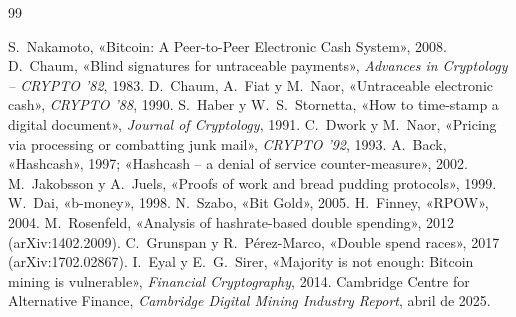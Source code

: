 \documentclass[11pt,a4paper]{article}
\newcommand{\webhint}[1]{}
\begin{document}
\begin{thebibliography}{99}
\webhint{section; id=referencias; slug=referencias; kicker=referencias; role=reference}
\small
{} S.~Nakamoto, «Bitcoin: A Peer-to-Peer Electronic Cash System», 2008.
 D.~Chaum, «Blind signatures for untraceable payments», \emph{Advances in Cryptology -- CRYPTO '82}, 1983.
 D.~Chaum, A.~Fiat y M.~Naor, «Untraceable electronic cash», \emph{CRYPTO '88}, 1990.
 S.~Haber y W.~S.~Stornetta, «How to time-stamp a digital document», \emph{Journal of Cryptology}, 1991.
 C.~Dwork y M.~Naor, «Pricing via processing or combatting junk mail», \emph{CRYPTO '92}, 1993.
 A.~Back, «Hashcash», 1997; «Hashcash -- a denial of service counter-measure», 2002.
 M.~Jakobsson y A.~Juels, «Proofs of work and bread pudding protocols», 1999.
 W.~Dai, «b-money», 1998.
 N.~Szabo, «Bit Gold», 2005.
 H.~Finney, «RPOW», 2004.
 M.~Rosenfeld, «Analysis of hashrate-based double spending», 2012 (arXiv:1402.2009).
 C.~Grunspan y R.~Pérez-Marco, «Double spend races», 2017 (arXiv:1702.02867).
 I.~Eyal y E.~G.~Sirer, «Majority is not enough: Bitcoin mining is vulnerable», \emph{Financial Cryptography}, 2014.
 Cambridge Centre for Alternative Finance, \emph{Cambridge Digital Mining Industry Report}, abril de 2025.
\end{thebibliography}
\end{document}
